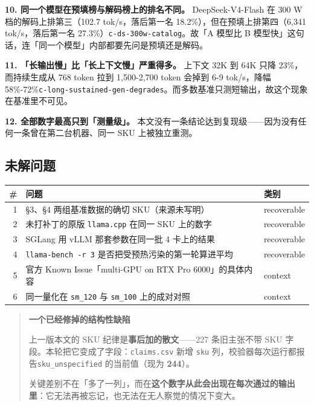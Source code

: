 \textbf{10. 同一个模型在预填榜与解码榜上的排名不同。} DeepSeek-V4-Flash 在 300 W 档的解码上排第三（102.7 tok/s，落后第一名 18.2\%），但在预填上排第四（6,341 tok/s，落后第一名 27.3\%）{\scriptsize\texttt{c-\hspace{0pt}ds-\hspace{0pt}300w-\hspace{0pt}catalog}}。故「A 模型比 B 模型快」这句话，连「同一个模型」内部都要先问是预填还是解码。


\textbf{11. 「长输出慢」比「长上下文慢」严重得多。} 上下文 32K 到 64K 只降 23\%，而持续生成从 768 token 拉到 1,500-2,700 token 会掉到 6-9 tok/s，降幅 58\%-72\%{\scriptsize\texttt{c-\hspace{0pt}long-\hspace{0pt}sustained-\hspace{0pt}gen-\hspace{0pt}degrades}}。而多数基准只测短输出，故这个现象在基准里不可见。


\textbf{12. 全部数字最高只到「测量级」。} 本文没有一条结论达到复现级——因为没有任何一条曾在第二台机器、同一 SKU 上被独立重测。


\subsection{未解问题}

\begin{table}[t]
\centering
\footnotesize
\setlength{\tabcolsep}{4pt}
\label{tab:24}
\begin{tabularx}{\textwidth}{rXl}
\toprule
\# & 问题 & 类别 \\
\midrule
1 & §3、§4 两组基准数据的确切 SKU（来源未写明） & recoverable \\
2 & 未打补丁的原版 \texttt{llama.cpp} 在同一 SKU 上的数字 & recoverable \\
3 & SGLang 用 vLLM 那套参数在同一批 4 卡上的结果 & recoverable \\
4 & \texttt{llama-bench -r 3} 是否把受预热污染的第一轮算进平均 & recoverable \\
5 & 官方 Known Issue「multi-GPU on RTX Pro 6000」的具体内容 & context \\
6 & 同一量化在 \texttt{sm\_120} 与 \texttt{sm\_100} 上的成对对照 & context \\
\bottomrule
\end{tabularx}
\end{table}

\begin{quote}\small
\textbf{ 一个已经修掉的结构性缺陷}

上一版本文的 SKU 纪律是\textbf{事后加的散文}——227 条旧主张不带 SKU 字段。本轮把它变成了字段：\texttt{claims.csv} 新增 \texttt{sku} 列，校验器每次运行都报告\texttt{sku\_unspecified} 的当前值（现为 \textbf{244}）。

关键差别不在「多了一列」，而在\textbf{这个数字从此会出现在每次通过的输出里}：它无法再被忘记，也无法在无人察觉的情况下变大。

\end{quote}


